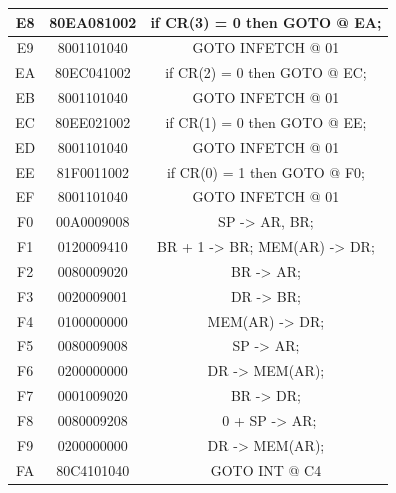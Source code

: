 \begin{center}
\begin{tabular}{|c|c|c|}
        \hline
        E8  & 80EA081002    & if CR(3) = 0 then GOTO @ EA; \\
        \hline
        E9  & 8001101040    & GOTO INFETCH @ 01 \\
        \hline
        EA  & 80EC041002    & if CR(2) = 0 then GOTO @ EC; \\
        \hline
        EB  & 8001101040    & GOTO INFETCH @ 01 \\
        \hline
        EC  & 80EE021002    & if CR(1) = 0 then GOTO @ EE; \\
        \hline
        ED  & 8001101040    & GOTO INFETCH @ 01 \\
        \hline
        EE  & 81F0011002    & if CR(0) = 1 then GOTO @ F0; \\
        \hline
        EF  & 8001101040    & GOTO INFETCH @ 01 \\
        \hline
        F0  & 00A0009008    & SP -> AR, BR; \\
        \hline
        F1  & 0120009410    & BR + 1 -> BR; MEM(AR) -> DR; \\
        \hline
        F2  & 0080009020    & BR -> AR; \\
        \hline
        F3  & 0020009001    & DR -> BR; \\
        \hline
        F4  & 0100000000    & MEM(AR) -> DR; \\
        \hline
        F5  & 0080009008    & SP -> AR; \\
        \hline
        F6  & 0200000000    & DR -> MEM(AR); \\
        \hline
        F7  & 0001009020    & BR -> DR; \\
        \hline
        F8  & 0080009208    & ~0 + SP -> AR; \\
        \hline
        F9  & 0200000000    & DR -> MEM(AR); \\
        \hline
        FA  & 80C4101040    & GOTO INT @ C4 \\
        \hline
    \end{tabular}
\end{center}

